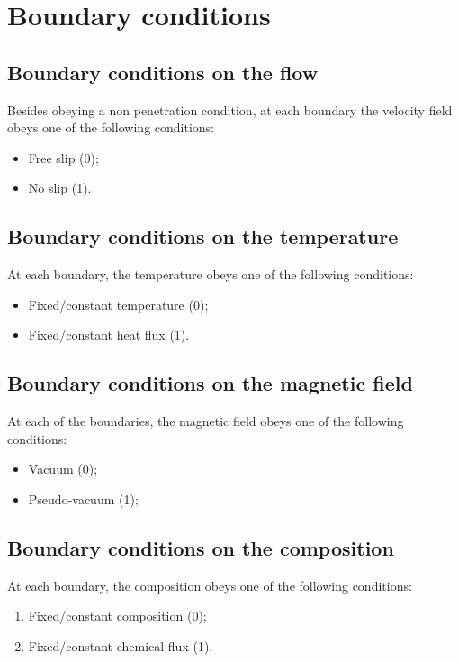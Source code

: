 \documentclass[a4paper,10pt]{book}
\begin{document}
\section{Boundary conditions}
\label{s:boundaryConditions}

\subsection{Boundary conditions on the flow}
Besides obeying a non penetration condition, at each boundary the velocity
field obeys one of the following conditions:
\begin{itemize}
\item Free slip (0);
\item No slip (1).
\end{itemize}

\subsection{Boundary conditions on the temperature}
At each boundary, the temperature obeys one of the following conditions:
\begin{itemize}
 \item Fixed/constant temperature (0);
 \item Fixed/constant heat flux (1).
\end{itemize}

\subsection{Boundary conditions on the magnetic field}
At each of the boundaries, the magnetic field obeys one of the following
conditions:
\begin{itemize}
 \item Vacuum (0);
 \item Pseudo-vacuum (1);
\end{itemize}

\subsection{Boundary conditions on the composition}
At each boundary, the composition obeys one of the following conditions:
\begin{enumerate}
 \item Fixed/constant composition (0);
 \item Fixed/constant chemical flux (1).
\end{enumerate}
\end{document}
